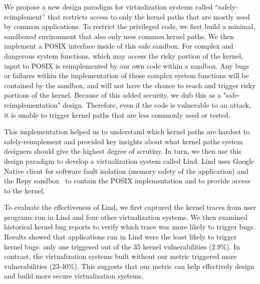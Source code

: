 We propose a new design paradigm for virtualization 
systems called ``safely-reimplement'' that restricts access to only the
kernel paths that are mostly used by common applications.  To restrict the privileged
code, we first build a minimal, sandboxed environment that also only uses 
common kernel paths.
We then implement a POSIX interface inside of this safe sandbox. For complex and dangerous system functions, which may access the risky portion of the kernel, 
input to POSIX is reimplemented by our own code within a sandbox. Any bugs or failures within the implementation of those complex system functions 
will be contained by the sandbox, and will not have the chance to reach 
and trigger risky portions of the kernel. Because of this added security, we dub this as a "safe-reimplementation" design.  Therefore, even if the code
is vulnerable to an attack, it is unable to trigger
kernel paths that are less commonly used or tested.

This implementation helped us to understand which kernel paths are hardest to
safely-reimplement and provided key insights about what kernel paths system
designers should give the highest degree of scrutiny. In turn, we then use this design paradigm to develop a virtualization system called
Lind.  Lind uses Google Native client for software fault isolation (memory
safety of the application) and the Repy sandbox~\cite{Repy-10} to contain the POSIX
implementation and to provide access to the kernel.   

To evaluate the effectiveness of Lind, we first captured the 
kernel traces from user programs run in Lind and four other virtualization
systems.
We then examined historical
kernel bug reports to verify which trace was more likely to trigger bugs.
Results showed that applications run in Lind were the least likely to
trigger kernel bugs: only one triggered out of the 35 kernel vulnerabilities 
(2.9\%). In contrast, the virtualization systems built
without our metric triggered more vulnerabilities (23-40\%). This
suggests that our metric can help effectively design and build more secure
virtualization systems.

